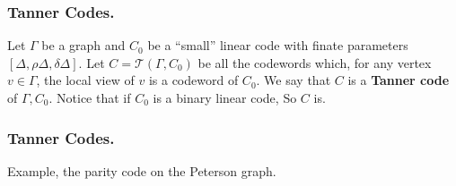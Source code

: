 \documentclass[usenames, aspectratio=169]{beamer}
\begin{document}
\begin{frame}
  \frametitle{ Tanner Codes. }
  \begin{definition} Let $\Gamma$ be a graph and $C_{0}$ be a ``small'' linear code with finate parameters $[\Delta, \rho\Delta, \delta\Delta]$. Let $ C = \mathcal{T}\left( \Gamma, C_{0} \right)$  be all the codewords which, for any vertex $v\in \Gamma$, the local view of $v$ is a codeword of $C_{0}$. We say that $C$ is a \textbf{Tanner code}\label{Tan} of $\Gamma, C_{0}$. Notice that if $C_{0}$ is a binary linear code, So $C$ is.  
  \end{definition}
\end{frame}


\begin{frame}
  \frametitle{ Tanner Codes. }
  Example, the parity code on the Peterson graph.
  \begin{center}
  \scalebox{0.65} {
\begin{tikzpicture}


\end{tikzpicture}}
\end{center}
\end{frame}
\end{document}
